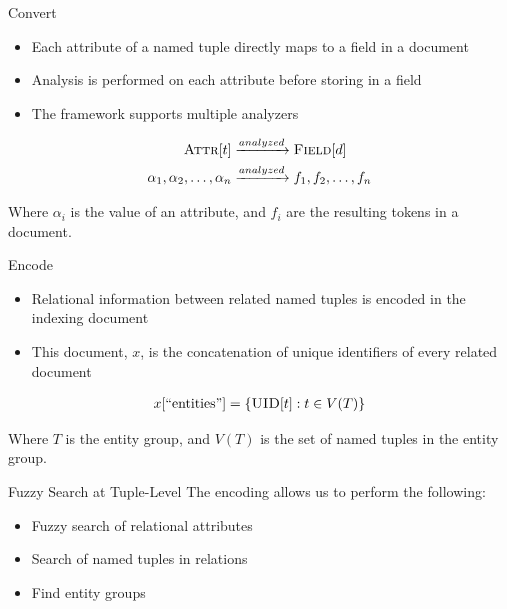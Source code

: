 \documentclass[compress]{beamer}
\newcommand{\prop}[2]{\ensuremath\textsc{#1}[#2]}
\newcommand{\attributes}[1]{\prop{Attr}{#1}}
\newcommand{\fields}[1]{\prop{Field}{#1}}
\newcommand{\uid}[1]{\prop{UID}{#1}}
\newcommand{\attribute}{\alpha}
\newcommand{\tuple}{t}
\newcommand{\doc}{d}
\newcommand{\field}{f}
\newcommand{\egraph}{T}
\begin{document}
		\begin{frame}{Convert}
			\begin{itemize}
				\item Each attribute of a named tuple directly maps to a field in a document
				\item Analysis is performed on each attribute before storing in a field
				\item The framework supports multiple analyzers
			\end{itemize}
			
			\begin{align}
				\attributes{\tuple} &\xrightarrow{analyzed} \fields{\doc} \\
				\attribute_1, \attribute_2, \dotsc, \attribute_n &\xrightarrow{analyzed} \field_1, \field_2, \dotsc, \field_n
			\end{align}
			
			Where \(\alpha_i\) is the value of an attribute, and \(f_i\) are the resulting tokens in a document.
		\end{frame}
		
		\begin{frame}{Encode}
			\begin{itemize}
				\item Relational information between related named tuples is encoded in the \alert{indexing document}
				\item This document, \(x\), is the concatenation of unique identifiers of every related document
			\end{itemize}
			
			\begin{align}
				x[\text{``entities''}] = \left\{\uid{\tuple} : \tuple \in V(\egraph)\right\}
			\end{align}
			
			Where \(\egraph\) is the entity group, and \(V(\egraph)\) is the set of named tuples in the entity group.
		\end{frame}
		
		\begin{frame}{Fuzzy Search at Tuple-Level}
			The encoding allows us to perform the following:
			
			\begin{itemize}
				\item Fuzzy search of relational attributes
				\item Search of named tuples in relations
				\item Find entity groups
			\end{itemize}
		\end{frame}
		
\end{document}
